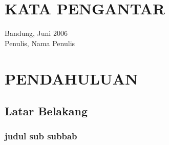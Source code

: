 \documentclass[a4paper,12pt]{book}
\begin{document}
\chapter*{KATA PENGANTAR}

\vspace*{2cm}
\begin{flushright}
Bandung, Juni 2006\\ %
Penulis,\hspace{0.8cm}
\vspace*{1.5cm}
Nama Penulis %
\end{flushright}
\tableofcontents  %
\listoftables %
\listoffigures %
\chapter{PENDAHULUAN} %
\label{pendahuluan}

\section{Latar Belakang} %
\label{latarbelakang} 
    \subsection{judul sub subbab}
     
\end{document}
